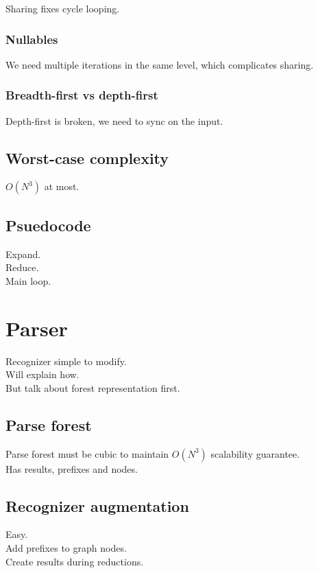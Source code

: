 \documentclass[a4paper,10pt]{article}
\begin{document}
Sharing fixes cycle looping.

\subsubsection{Nullables}

We need multiple iterations in the same level, which complicates sharing.

\subsubsection{Breadth-first vs depth-first}

Depth-first is broken, we need to sync on the input.

\subsection{Worst-case complexity}

$O(N^3)$ at most.

\subsection{Psuedocode}

Expand.\\
Reduce.\\
Main loop.

\section{Parser}

Recognizer simple to modify.\\
Will explain how.\\
But talk about forest representation first.

\subsection{Parse forest}

Parse forest must be cubic to maintain $O(N^3)$ scalability guarantee.\\
Has results, prefixes and nodes.

\subsection{Recognizer augmentation}

Easy.\\
Add prefixes to graph nodes.\\
Create results during reductions.
\end{document}
